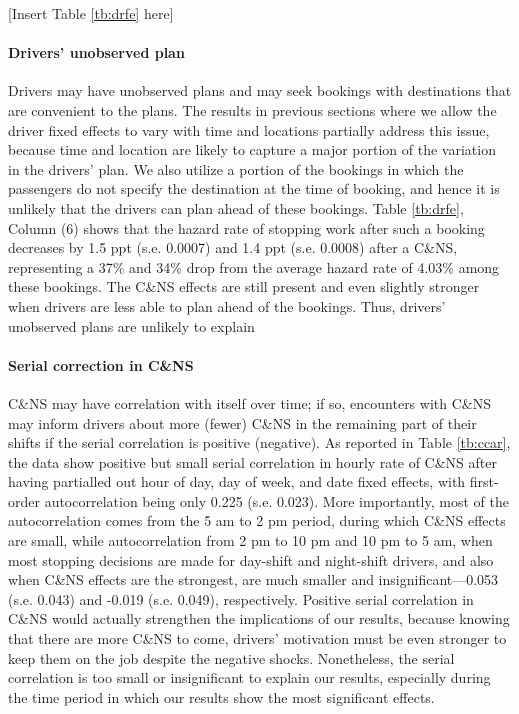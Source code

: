 \documentclass[reviewmode]{restud}
\begin{document}
\begin{center}
    [Insert Table \ref{tb:drfe} here]
\end{center}

\paragraph{Drivers' unobserved plan} Drivers may have unobserved plans and may seek bookings with destinations that are convenient to the plans. The results in previous sections where we allow the driver fixed effects to vary with time and locations partially address this issue, because time and location are likely to capture a major portion of the variation in the drivers' plan. We also utilize a portion of the bookings in which the passengers do not specify the destination at the time of booking, and hence it is unlikely that the drivers can plan ahead of these bookings. Table \ref{tb:drfe}, Column (6) shows that the hazard rate of stopping work after such a booking decreases by 1.5 ppt (s.e. 0.0007) and 1.4 ppt (s.e. 0.0008) after a C\&NS, representing a 37\% and 34\% drop from the average hazard rate of 4.03\% among these bookings. The C\&NS effects are still present and even slightly stronger when drivers are less able to plan ahead of the bookings. Thus, drivers' unobserved plans are unlikely to explain


\paragraph{Serial correction in C\&NS} C\&NS may have correlation with itself over time; if so, encounters with C\&NS may inform drivers about more (fewer) C\&NS in the remaining part of their shifts if the serial correlation is positive (negative). As reported in Table \ref{tb:ccar}, the data show positive but small serial correlation in hourly rate of C\&NS after having partialled out hour of day, day of week, and date fixed effects, with first-order autocorrelation being only 0.225 (s.e. 0.023). More importantly, most of the autocorrelation comes from the 5 am to 2 pm period, during which C\&NS effects are small, while autocorrelation from 2 pm to 10 pm and 10 pm to 5 am, when most stopping decisions are made for day-shift and night-shift drivers, and also when C\&NS effects are the strongest, are much smaller and insignificant---0.053 (s.e. 0.043) and -0.019 (s.e. 0.049), respectively. Positive serial correlation in C\&NS would actually strengthen the implications of our results, because knowing that there are more C\&NS to come, drivers' motivation must be even stronger to keep them on the job despite the negative shocks. Nonetheless, the serial correlation is too small or insignificant to explain our results, especially during the time period in which our results show the most significant effects.
\end{document}
